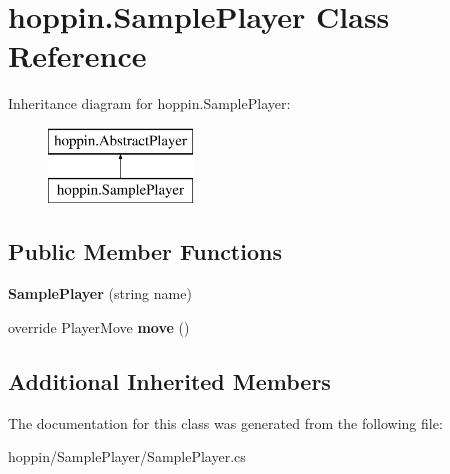 \hypertarget{classhoppin_1_1_sample_player}{}\section{hoppin.\+Sample\+Player Class Reference}
\label{classhoppin_1_1_sample_player}
Inheritance diagram for hoppin.\+Sample\+Player\+:\begin{figure}[H]
\begin{center}
\leavevmode
\includegraphics[height=2.000000cm]{classhoppin_1_1_sample_player}
\end{center}
\end{figure}
\subsection*{Public Member Functions}
\begin{DoxyCompactItemize}
\item 
{\bfseries Sample\+Player} (string name)\hypertarget{classhoppin_1_1_sample_player_ab54d749ed27ffe85c01f939cdb4c5c70}{}\label{classhoppin_1_1_sample_player_ab54d749ed27ffe85c01f939cdb4c5c70}

\item 
override Player\+Move {\bfseries move} ()\hypertarget{classhoppin_1_1_sample_player_a6a27c215c5363baf80910f5d44385c7f}{}\label{classhoppin_1_1_sample_player_a6a27c215c5363baf80910f5d44385c7f}

\end{DoxyCompactItemize}
\subsection*{Additional Inherited Members}


The documentation for this class was generated from the following file\+:\begin{DoxyCompactItemize}
\item 
hoppin/\+Sample\+Player/Sample\+Player.\+cs\end{DoxyCompactItemize}
